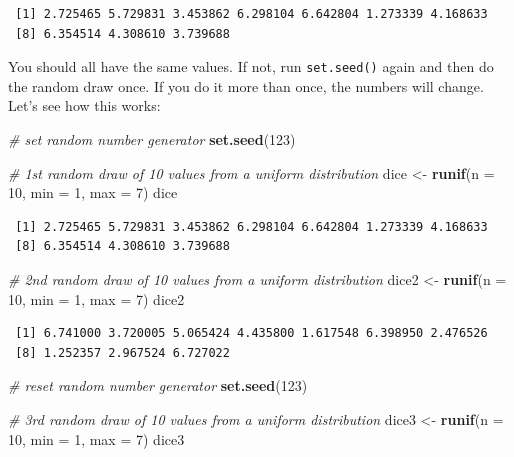 \documentclass[]{article}
\newenvironment{Shaded}{\begin{snugshade}}{\end{snugshade}}
\newcommand{\KeywordTok}[1]{\textcolor[rgb]{0.13,0.29,0.53}{\textbf{#1}}}
\newcommand{\DataTypeTok}[1]{\textcolor[rgb]{0.13,0.29,0.53}{#1}}
\newcommand{\DecValTok}[1]{\textcolor[rgb]{0.00,0.00,0.81}{#1}}
\newcommand{\StringTok}[1]{\textcolor[rgb]{0.31,0.60,0.02}{#1}}
\newcommand{\CommentTok}[1]{\textcolor[rgb]{0.56,0.35,0.01}{\textit{#1}}}
\newcommand{\NormalTok}[1]{#1}
\theoremstyle{definition}
\theoremstyle{definition}
\theoremstyle{definition}
\theoremstyle{remark}
\begin{document}
\begin{verbatim}
 [1] 2.725465 5.729831 3.453862 6.298104 6.642804 1.273339 4.168633
 [8] 6.354514 4.308610 3.739688
\end{verbatim}

You should all have the same values. If not, run \texttt{set.seed()}
again and then do the random draw once. If you do it more than once, the
numbers will change. Let's see how this works:

\begin{Shaded}
\begin{Highlighting}[]
\CommentTok{# set random number generator}
\KeywordTok{set.seed}\NormalTok{(}\DecValTok{123}\NormalTok{)}

\CommentTok{# 1st random draw of 10 values from a uniform distribution}
\NormalTok{dice <-}\StringTok{ }\KeywordTok{runif}\NormalTok{(}\DataTypeTok{n =} \DecValTok{10}\NormalTok{, }\DataTypeTok{min =} \DecValTok{1}\NormalTok{, }\DataTypeTok{max =} \DecValTok{7}\NormalTok{)}
\NormalTok{dice}
\end{Highlighting}
\end{Shaded}

\begin{verbatim}
 [1] 2.725465 5.729831 3.453862 6.298104 6.642804 1.273339 4.168633
 [8] 6.354514 4.308610 3.739688
\end{verbatim}

\begin{Shaded}
\begin{Highlighting}[]
\CommentTok{# 2nd random draw of 10 values from a uniform distribution}
\NormalTok{dice2 <-}\StringTok{ }\KeywordTok{runif}\NormalTok{(}\DataTypeTok{n =} \DecValTok{10}\NormalTok{, }\DataTypeTok{min =} \DecValTok{1}\NormalTok{, }\DataTypeTok{max =} \DecValTok{7}\NormalTok{)}
\NormalTok{dice2}
\end{Highlighting}
\end{Shaded}

\begin{verbatim}
 [1] 6.741000 3.720005 5.065424 4.435800 1.617548 6.398950 2.476526
 [8] 1.252357 2.967524 6.727022
\end{verbatim}

\begin{Shaded}
\begin{Highlighting}[]
\CommentTok{# reset random number generator}
\KeywordTok{set.seed}\NormalTok{(}\DecValTok{123}\NormalTok{)}

\CommentTok{# 3rd random draw of 10 values from a uniform distribution}
\NormalTok{dice3 <-}\StringTok{ }\KeywordTok{runif}\NormalTok{(}\DataTypeTok{n =} \DecValTok{10}\NormalTok{, }\DataTypeTok{min =} \DecValTok{1}\NormalTok{, }\DataTypeTok{max =} \DecValTok{7}\NormalTok{)}
\NormalTok{dice3}
\end{Highlighting}
\end{Shaded}
\end{document}
